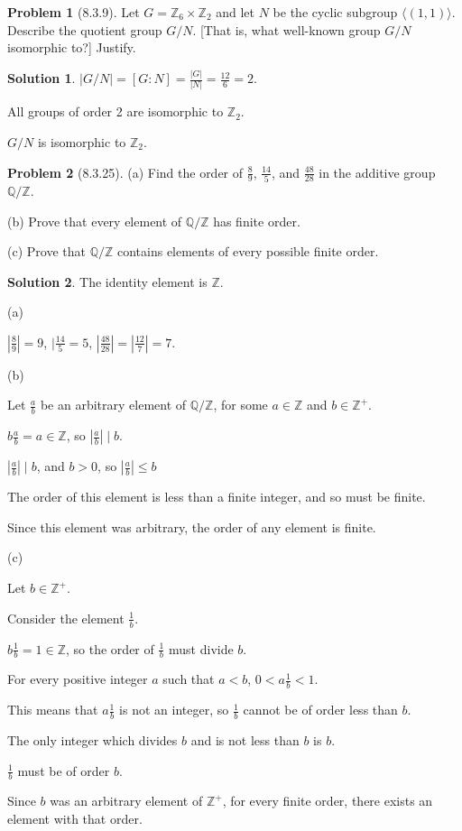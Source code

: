 \documentclass[12pt]{article}
\theoremstyle{definition}
\newtheorem*{prob}{Problem}
\newtheorem*{soln}{Solution}
\newcommand{\ZZ}{{\mathbb{Z}}}
\newcommand{\QQ}{{\mathbb{Q}}}
\begin{document}
\begin{prob}[8.3.9]
Let $G = \ZZ_6 \times \ZZ_2$ and let $N$ be the cyclic subgroup $\langle (1, 1) \rangle$. 
Describe the quotient group $G/N$. [That is, what well-known group $G/N$ isomorphic to?]
Justify.
\end{prob}

\begin{soln}

$|G/N|=[G:N]=\frac{|G|}{|N|}=\frac{12}{6}=2$.

All groups of order 2 are isomorphic to $\ZZ_2$.

$G/N$ is isomorphic to $\ZZ_2$.

\end{soln}

\begin{prob}[8.3.25] \text{ }

(a) Find the order of  $\frac{8}{9}$, $\frac{14}{5}$, and 
$\frac{48}{28}$ in the additive group $\QQ/\ZZ$.

(b) Prove that every element of  $\QQ/\ZZ$ has finite order.     

(c) Prove that $\QQ/\ZZ$ contains elements of  every possible finite order.
\end{prob}

\begin{soln}\quad

The identity element is $\ZZ$.

(a)

$|\frac89|=9$, $|\frac{14}5=5$, $|\frac{48}{28}|=|\frac{12}7|=7$.

(b)

Let $\frac ab$ be an arbitrary element of $\QQ/\ZZ$,
for some $a\in \ZZ$ and $b\in\ZZ^+$.

$b\frac ab=a\in\ZZ$, so $|\frac ab|\mid b$.

$|\frac ab|\mid b$, and $b>0$, so $|\frac ab|\leq b$

The order of this element is less than a finite integer, and so must be finite.

Since this element was arbitrary, the order of any element is finite.

(c)

Let $b\in\ZZ^+$.

Consider the element $\frac1b$.

$b\frac1b=1\in\ZZ$, so the order of $\frac1b$ must divide $b$.

For every positive integer $a$ such that $a<b$, $0<a\frac 1b<1$.

This means that $a\frac 1b$ is not an integer, so $\frac1b$
cannot be of order less than $b$.

The only integer which divides $b$ and is not less than $b$ is $b$.

$\frac1b$ must be of order $b$.

Since $b$ was an arbitrary element of $\ZZ^+$,
for every finite order, there exists an element with that order.

\end{soln}
\end{document}
